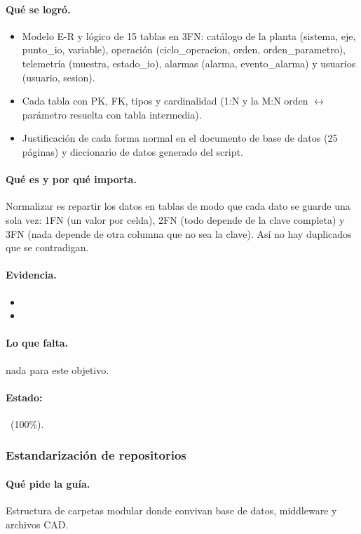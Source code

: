 \documentclass[a4paper,11pt]{article}
\begin{document}
\paragraph{Qué se logró.}
\begin{itemize}
\item Modelo E-R y lógico de 15 tablas en 3FN: catálogo de la planta (sistema, eje, punto\_io, variable), operación (ciclo\_operacion, orden, orden\_parametro), telemetría (muestra, estado\_io), alarmas (alarma, evento\_alarma) y usuarios (usuario, sesion).
\item Cada tabla con PK, FK, tipos y cardinalidad (1:N y la M:N orden $\leftrightarrow$ parámetro resuelta con tabla intermedia).
\item Justificación de cada forma normal en el documento de base de datos (25 páginas) y diccionario de datos generado del script.
\end{itemize}
\paragraph{Qué es y por qué importa.} Normalizar es repartir los datos en tablas de modo que cada dato se guarde una sola vez: 1FN (un valor por celda), 2FN (todo depende de la clave completa) y 3FN (nada depende de otra columna que no sea la clave). Así no hay duplicados que se contradigan.
\paragraph{Evidencia.}
\begin{itemize}\small
\item {}
\item {}
\end{itemize}
\paragraph{Lo que falta.} nada para este objetivo.
\paragraph{Estado:} \cumple~(100\%).
\subsubsection{Estandarización de repositorios}
\paragraph{Qué pide la guía.} Estructura de carpetas modular donde convivan base de datos, middleware y archivos CAD.
\end{document}
